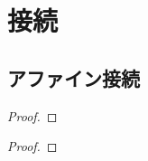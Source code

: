 \documentclass[report]{jlreq}
\begin{document}
\tableofcontents
\markboth{\contentsname}{}

%
\newpage
\setcounter{chapter}{1}
\chapter{接続}

%
\setcounter{section}{8}
\section{アファイン接続}

\begin{definition}[アファイン接続]
    \TODO{}
\end{definition}

\begin{definition}[捩率テンソル]
    \TODO{}
\end{definition}

\begin{definition}[曲率テンソル]
    \TODO{}
\end{definition}

\begin{proposition}
    \TODO{}
\end{proposition}

\begin{proof}
    \TODO{}
\end{proof}

\begin{definition}[接続形式]
    \TODO{}
\end{definition}

\begin{definition}[捩れ形式と曲率形式]
    \TODO{}
\end{definition}

\begin{theorem}[構造方程式]
    \TODO{}
\end{theorem}

\begin{proof}
    \TODO{}
\end{proof}

\begin{proposition}
    \TODO{}
\end{proposition}
\end{document}
